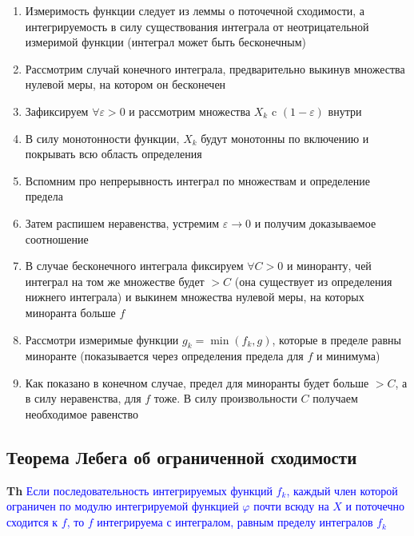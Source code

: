 \documentclass[a4paper, 14pt]{article}
\begin{document}
    \begin{enumerate}
        \item Измеримость функции следует из леммы о поточечной сходимости, а интегрируемость в силу
        существования интеграла от неотрицательной измеримой функции (интеграл может быть бесконечным)
        \item Рассмотрим случай конечного интеграла, предварительно выкинув множества нулевой меры, на котором он
        бесконечен
        \item Зафиксируем $\forall \varepsilon > 0$ и рассмотрим множества $X_k$ c $(1 - \varepsilon)$ внутри
        \item В силу монотонности функции, $X_k$ будут монотонны по включению и покрывать всю область определения
        \item Вспомним про непрерывность интеграл по множествам и определение предела
        \item Затем распишем неравенства, устремим $\varepsilon \rightarrow 0$ и получим доказываемое соотношение
        \item В случае бесконечного интеграла фиксируем $\forall C > 0$ и миноранту, чей интеграл на том же множестве
        будет $> C$ (она существует из определения нижнего интеграла) и выкинем множества нулевой меры, на
        которых миноранта больше $f$
        \item Рассмотри измеримые функции $g_k = \min(f_k, g)$, которые в пределе равны миноранте (показывается через
        определения предела для $f$ и минимума)
        \item Как показано в конечном случае, предел для миноранты будет больше $> C$, а в силу неравенства, для $f$
        тоже.
        В силу произвольности $C$ получаем необходимое равенство
    \end{enumerate}

    \subsection{Теорема Лебега об ограниченной сходимости}

    \textbf{Th} \textcolor{blue}{Если последовательность интегрируемых функций $f_k$, каждый член которой ограничен по
    модулю интегрируемой функцией $\varphi$ почти всюду на $X$ и поточечно сходится к $f$, то $f$ интегрируема с
    интегралом, равным пределу интегралов $f_k$}
\end{document}
